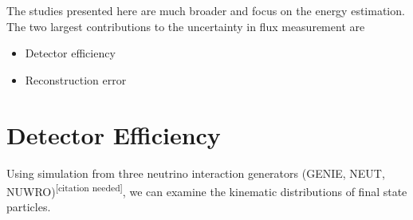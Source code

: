 \documentclass{article}
\begin{document}
The studies presented here are much broader and focus on the energy estimation.  The two largest contributions to the uncertainty in flux measurement are

\begin{itemize}
\item Detector efficiency
\item Reconstruction error
\end{itemize}

\section{Detector Efficiency}

Using simulation from three neutrino interaction generators (GENIE, NEUT, NUWRO)\textsuperscript{[citation needed]}, we can examine the kinematic distributions of final state particles.






\end{document}
